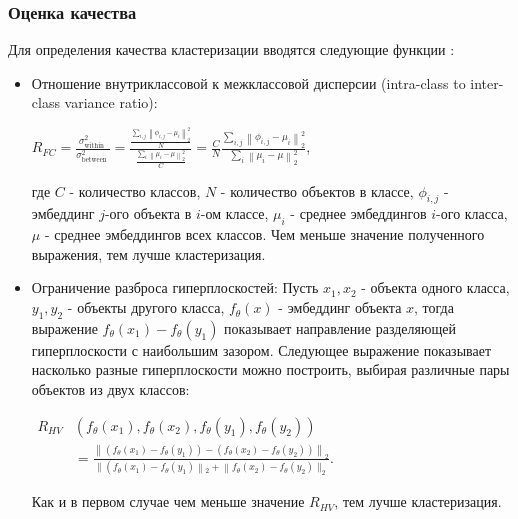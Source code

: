 \subsubsection{Оценка качества}
\label{subsec:ClusteringQuality}
    Для определения качества кластеризации вводятся следующие функции \cite{EmbedMetaFSL}:
    \begin{itemize}
        \item Отношение внутриклассовой к межклассовой дисперсии (intra-class to inter-class variance ratio): 
        \begin{center}
            
        \Large
        $R_{FC}=\frac{\sigma_{\text {within }}^2}{\sigma_{\text {between }}^2}=\frac{\frac{\sum_{i, j}\left\|\phi_{i, j}-\mu_i\right\|_2^2}{N}}{\frac{\sum_i\left\|\mu_i-\mu\right\|_2^2}{C}}=\frac{C}{N} \frac{\sum_{i, j}\left\|\phi_{i, j}-\mu_i\right\|_2^2}{\sum_i\left\|\mu_i-\mu\right\|_2^2}$,
        
        \end{center}
        \normalsize

        где $C$ - количество классов, $N$ - количество объектов в классе,  $\phi_{i, j}$ - эмбеддинг $j$-ого объекта в $i$-ом классе, $\mu_i$ - среднее эмбеддингов $i$-ого класса, $\mu$ - среднее эмбеддингов всех классов.
        Чем меньше значение полученного выражения, тем лучше кластеризация.

        \item Ограничение разброса гиперплоскостей: Пусть $x_1, x_2$ - объекта одного класса, $y_1, y_2$ - объекты другого класса, $f_\theta\left(x\right)$ - эмбеддинг объекта $x$, тогда выражение $f_\theta\left(x_1\right)-f_\theta\left(y_1\right)$ показывает направление разделяющей гиперплоскости с наибольшим зазором. Следующее выражение показывает насколько разные гиперплоскости можно построить, выбирая различные пары объектов из двух классов: 
        
        \begin{center}

        \Large
        
        $\begin{aligned} R_{HV} & \left(f_\theta\left(x_1\right), f_\theta\left(x_2\right), f_\theta\left(y_1\right), f_\theta\left(y_2\right)\right) \\ & =\frac{\left\|\left(f_\theta\left(x_1\right)-f_\theta\left(y_1\right)\right)-\left(f_\theta\left(x_2\right)-f_\theta\left(y_2\right)\right)\right\|_2}{\|\left(f_\theta\left(x_1\right)-f_\theta\left(y_1\right)\left\|_2+\right\| f_\theta\left(x_2\right)-f_\theta\left(y_2\right) \|_2\right.} .\end{aligned}$
        
        \end{center}
        \normalsize
        Как и в первом случае чем меньше значение $R_{H V}$, тем лучше кластеризация.
        
    \end{itemize}

